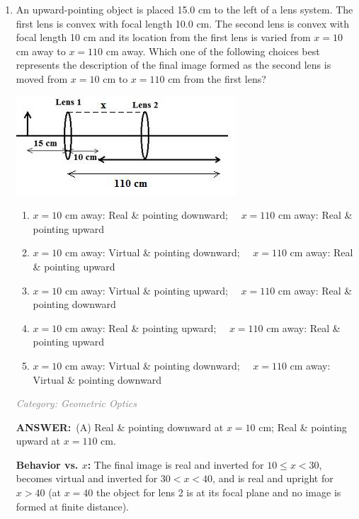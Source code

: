 ﻿\documentclass[12pt, a4paper]{article}
\makeatletter
\newcommand{\finalanswer}[1]{\textbf{ANSWER:}~#1}
\newif\if@categoryprinted
\newcommand{\category}[1]{\if@categoryprinted\relax\else\textit{\textcolor{gray}{Category: #1}}\global\@categoryprintedtrue\fi}
\makeatother
\begin{document}
\begin{CJK*}{UTF8}{gbsn}
\begin{enumerate}[itemsep=1.0em, topsep=0.6em]
\item \label{prob:25}
\noindent\begin{minipage}[t]{0.6\linewidth}
\vspace{0pt}
An upward-pointing object is placed 15.0 cm to the left of a lens system. The first lens is convex with focal length 10.0 cm. The second lens is convex with focal length 10 cm and its location from the first lens is varied from $x=10$ cm away to $x=110$ cm away. Which one of the following choices best represents the description of the final image formed as the second lens is moved from $x=10$ cm to $x=110$ cm from the first lens?
\end{minipage}%
\hfill
\begin{minipage}[t]{0.32\linewidth}
\vspace{0pt}
\centering
\includegraphics[width=\linewidth]{Problem_26_Figure.png}
\end{minipage}

\begin{enumerate}[label=(\Alph*)]
    \item $x=10$ cm away: Real \& pointing downward; $\quad x=110$ cm away: Real \& pointing upward
    \item $x=10$ cm away: Virtual \& pointing downward; $\quad x=110$ cm away: Real \& pointing upward
    \item $x=10$ cm away: Virtual \& pointing upward; $\quad x=110$ cm away: Real \& pointing downward
    \item $x=10$ cm away: Real \& pointing upward; $\quad x=110$ cm away: Real \& pointing upward
    \item $x=10$ cm away: Virtual \& pointing downward; $\quad x=110$ cm away: Virtual \& pointing downward
\end{enumerate}

\category{Geometric Optics}
\begin{answerbox}
\finalanswer{(A) Real \& pointing downward at $x=10$ cm; Real \& pointing upward at $x=110$ cm.}
\end{answerbox}
\begin{solutionbox}
\textbf{Behavior vs. $x$:} The final image is real and inverted for $10\le x<30$, becomes virtual and inverted for $30<x<40$, and is real and upright for $x>40$ (at $x=40$ the object for lens 2 is at its focal plane and no image is formed at finite distance).


\end{solutionbox}
\end{enumerate}
\end{CJK*}
\end{document}
